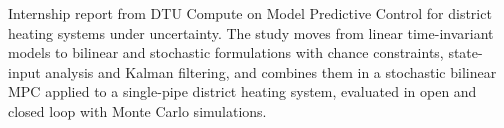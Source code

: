 
\begin{ProjectSummary}
Internship report from DTU Compute on Model Predictive Control for district heating
systems under uncertainty. The study moves from linear time-invariant models to bilinear and
stochastic formulations with chance constraints, state-input analysis and Kalman filtering,
and combines them in a stochastic bilinear MPC applied to a single-pipe district heating
system, evaluated in open and closed loop with Monte Carlo simulations.
\end{ProjectSummary}

